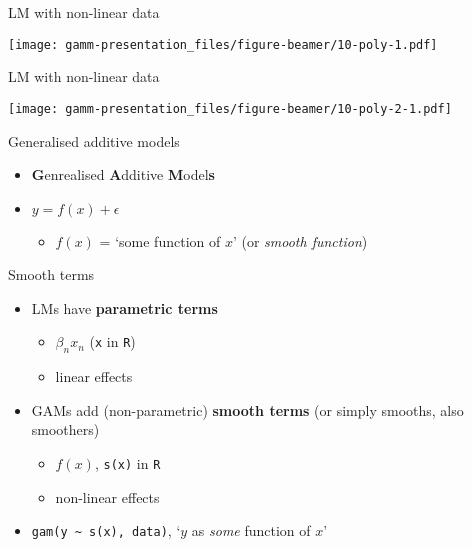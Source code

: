 \documentclass[ignorenonframetext,]{beamer}
\providecommand{\tightlist}{%
  \setlength{\itemsep}{0pt}\setlength{\parskip}{0pt}}
\begin{document}
\begin{frame}{LM with non-linear data}
\protect\hypertarget{lm-with-non-linear-data-6}{}

\texttt{[image: gamm-presentation\_files/figure-beamer/10-poly-1.pdf]}

\end{frame}

\begin{frame}{LM with non-linear data}
\protect\hypertarget{lm-with-non-linear-data-7}{}

\texttt{[image: gamm-presentation\_files/figure-beamer/10-poly-2-1.pdf]}

\end{frame}

\begin{frame}{Generalised additive models}
\protect\hypertarget{generalised-additive-models}{}

\begin{itemize}
\item
  \textbf{G}enrealised \textbf{A}dditive \textbf{M}odel\textbf{s}
\item
  \(y = f(x) + \epsilon\)

  \begin{itemize}
  \tightlist
  \item
    \(f(x)\) = `some function of \(x\)' (or \emph{smooth function})
  \end{itemize}
\end{itemize}

\end{frame}

\begin{frame}[fragile]{Smooth terms}
\protect\hypertarget{smooth-terms}{}

\begin{itemize}
\tightlist
\item
  LMs have \textbf{parametric terms}

  \begin{itemize}
  \tightlist
  \item
    \(\beta_nx_n\) (\texttt{x} in \texttt{R})
  \item
    linear effects
  \end{itemize}
\item
  GAMs add (non-parametric) \textbf{smooth terms} (or simply smooths,
  also smoothers)

  \begin{itemize}
  \tightlist
  \item
    \(f(x)\), \texttt{s(x)} in \texttt{R}
  \item
    non-linear effects
  \end{itemize}
\item
  \texttt{gam(y\ \textasciitilde{}\ s(x),\ data)}, `\(y\) as \emph{some}
  function of \(x\)'
\end{itemize}

\end{frame}
\end{document}

